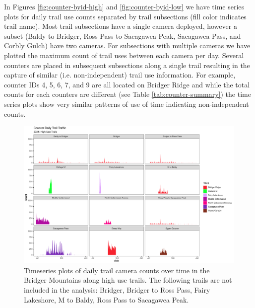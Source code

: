 \documentclass[
]{book}
\begin{document}
In Figures \autoref{fig:counter-byid-high} and
\ref{fig:counter-byid-low} we have time series plots for daily trail
use counts separated by trail subsections (fill color indicates trail
name). Most trail subsections have a single camera deployed, however a
subset (Baldy to Bridger, Ross Pass to Sacagawea Peak, Sacagawea Pass,
and Corbly Gulch) have two cameras. For subsections with multiple
cameras we have plotted the maximum count of trail uses between each
camera per day. Several counters are placed in subsequent subsections
along a single trail resulting in the capture of similar (i.e.
non-independent) trail use information. For example, counter IDs 4, 5,
6, 7, and 9 are all located on Bridger Ridge and while the total counts
for each counters are different (see Table \ref{tab:counter-summary})
the time series plots show very similar patterns of use of time
indicating non-independent counts.

\begin{figure}

{\centering \includegraphics[width=1\linewidth]{../figures/Counter_bySubSection_TS_highuse} 

}

\caption{Timeseries plots of daily trail camera counts over time in the Bridger Mountains along high use trails. The following trails are not included in the analysis: Bridger, Bridger to Ross Pass, Fairy Lakeshore, M to Baldy, Ross Pass to Sacagawea Peak.}\label{fig:counter-byid-high}
\end{figure}
\end{document}
